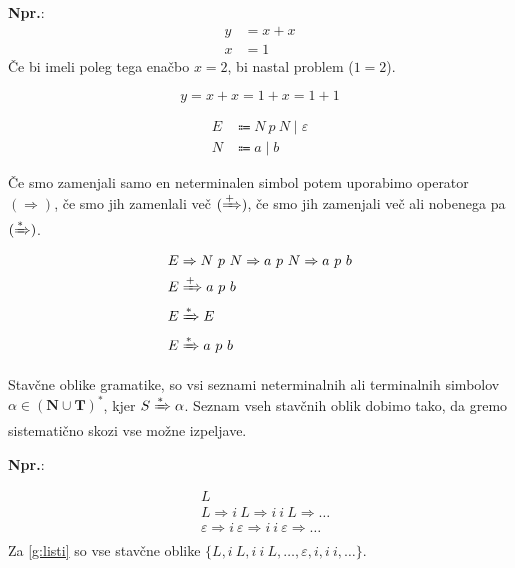 \documentclass{article}
\newcommand{\Ex}{\textbf{Npr.}:\ }
\newcommand{\Set}[1]{\mathbf{#1}}
\newcommand{\Grammar}{G}
\newcommand{\Terminals}{\Set{T}}
\newcommand{\NonTerminals}{\Set{N}}
\newcommand{\StartSymbol}{S}
\newcommand{\Null}{\varepsilon}
\newcommand{\Arrow}{\Coloneqq}
\newcommand{\Derive}{\Rightarrow}
\newcommand{\DeriveStar}{\xRightarrow{\ast}}
\newcommand{\DerivePlus}{\xRightarrow{+}}
\newcommand{\Seq}{\ }
\newcommand{\Union}{\mathrel{|}}
\newcommand{\Kleene}[1]{#1^\ast}
\begin{document}
\Ex
  \begin{align*}
    y &= x + x\\
    x &= 1
  \end{align*}
  Če bi imeli poleg tega enačbo $x = 2$, bi nastal problem ($1 = 2$).

  \begin{equation*}
    y = x + x = 1 + x = 1 + 1
  \end{equation*}

  \begin{equation}
    \tag{$\Grammar_2$}
    \label{g:plusab}
    \begin{aligned}
      E &\Arrow N \Seq p \Seq N \Union \Null\\
      N &\Arrow a \Union b
    \end{aligned}
  \end{equation}

Če smo zamenjali samo en neterminalen simbol potem uporabimo operator $(\Derive)$, če smo jih zamenlali več $(\DerivePlus)$, če smo jih zamenjali več ali nobenega pa $(\DeriveStar)$.
  \begin{align*}
    E &\Derive N \Seq p \Seq N \Derive a \Seq p \Seq N \Derive a \Seq p \Seq b \\
    E &\DerivePlus a \Seq p \Seq b\\
    E &\DeriveStar E\\
    E &\DeriveStar a \Seq p \Seq b
  \end{align*}

Stavčne oblike gramatike, so vsi seznami neterminalnih ali terminalnih simbolov $\alpha \in \Kleene{(\NonTerminals \cup \Terminals)}$, kjer $\StartSymbol \DeriveStar \alpha$.
Seznam vseh stavčnih oblik dobimo tako, da gremo sistematično skozi vse možne izpeljave.

\Ex

  \begin{align*}
    &L \\
    &L \Derive i \Seq L \Derive i \Seq i \Seq L \Derive \dots \\
    &\Null \Derive i \Seq \Null \Derive i \Seq i \Seq \Null \Derive \dots \\
  \end{align*}
Za \ref{g:listi} so vse stavčne oblike $\{L, i \Seq L, i \Seq i \Seq L, \dots, \Null, i, i \Seq i, \dots\}$.
\end{document}
